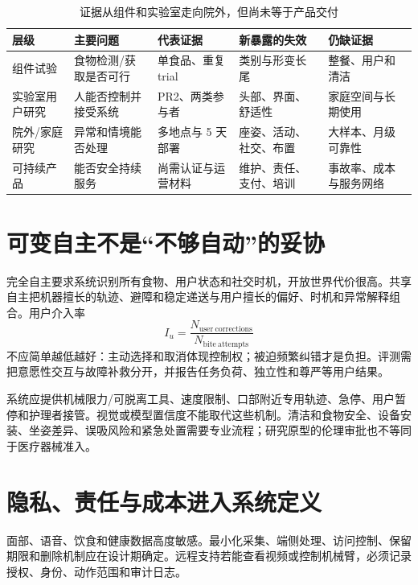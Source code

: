 \begin{table}[H]
\begingroup{}
\centering
\caption{证据从组件和实验室走向院外，但尚未等于产品交付}
\label{tab:feeding-evidence-ladder}
\begin{tabularx}{\textwidth}{p{}YYYp{0.20\textwidth}}
\toprule
层级 & 主要问题 & 代表证据 & 新暴露的失效 & 仍缺证据 \\
\midrule
组件试验 & 食物检测/获取是否可行 & 单食品、重复 trial & 类别与形变长尾 & 整餐、用户和清洁 \\
实验室用户研究 & 人能否控制并接受系统 & PR2、两类参与者 & 头部、界面、舒适性 & 家庭空间与长期使用 \\
院外/家庭研究 & 异常和情境能否处理 & 多地点与 5 天部署 & 座姿、活动、社交、布置 & 大样本、月级可靠性 \\
可持续产品 & 能否安全持续服务 & 尚需认证与运营材料 & 维护、责任、支付、培训 & 事故率、成本与服务网络 \\
\bottomrule
\end{tabularx}
\endgroup
\end{table}

\section{可变自主不是“不够自动”的妥协}

完全自主要求系统识别所有食物、用户状态和社交时机，开放世界代价很高。共享自主把机器擅长的轨迹、避障和稳定递送与用户擅长的偏好、时机和异常解释组合。用户介入率
\begin{equation}
I_u=\frac{N_{\mathrm{user\ corrections}}}{N_{\mathrm{bite\ attempts}}}
\label{eq:user-intervention-rate}
\end{equation}
不应简单越低越好：主动选择和取消体现控制权；被迫频繁纠错才是负担。评测需把意愿性交互与故障补救分开，并报告任务负荷、独立性和尊严等用户结果。

系统应提供机械限力/可脱离工具、速度限制、口部附近专用轨迹、急停、用户暂停和护理者接管。视觉或模型置信度不能取代这些机制。清洁和食物安全、设备安装、坐姿差异、误吸风险和紧急处置需要专业流程；研究原型的伦理审批也不等同于医疗器械准入。

\section{隐私、责任与成本进入系统定义}

面部、语音、饮食和健康数据高度敏感。最小化采集、端侧处理、访问控制、保留期限和删除机制应在设计期确定。远程支持若能查看视频或控制机械臂，必须记录授权、身份、动作范围和审计日志。

